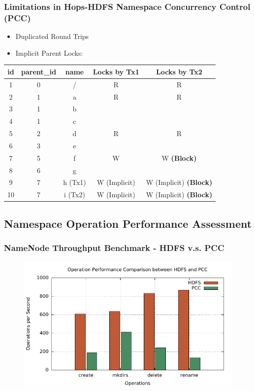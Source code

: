 \documentclass{beamer}
\begin{document}
\begin{frame}
	\frametitle{Limitations in Hops-HDFS Namespace Concurrency Control (PCC)}
		\begin{itemize}
			\item Duplicated Round Trips
			\item Implicit Parent Locks:
		\end{itemize}
\begin{table}[h]
	\centering
	\begin{tabular}{|c|c|c|c|c|}
		\hline
		\textbf{id} & \textbf{parent\_id} & \textbf{name} & \textbf{Locks by Tx1} & \textbf{Locks by Tx2} \\ \hline
		1 & 0 & / & R & R \\ \hline
		2 & 1 & a & R & R \\ \hline
		3 & 1 & b & ~ & ~ \\ \hline
		4 & 1 & c & ~ & ~ \\ \hline
		5 & 2 & d & R & R\\ \hline
		6 & 3 & e & ~ & ~ \\ \hline
		7 & 5 & f  & W & W \textbf{(Block)} \\ \hline
		8 & 6 & g & ~ & ~ \\ \hline
		9 & 7 & h (Tx1) & W (Implicit) & W (Implicit) \textbf{(Block)}\\ \hline
		10 & 7 & i (Tx2) & W (Implicit) & W (Implicit)  \textbf{(Block)}\\ \hline
	\end{tabular}
\end{table}
\end{frame}

\subsection{Namespace Operation Performance Assessment}
\begin{frame}
	\frametitle{NameNode Throughput Benchmark - HDFS v.s. PCC}
	\begin{figure}[h]
		\centering
		\includegraphics[width=\linewidth]{figs/nn_100.pdf}
	\end{figure}
\end{frame}
\end{document}
